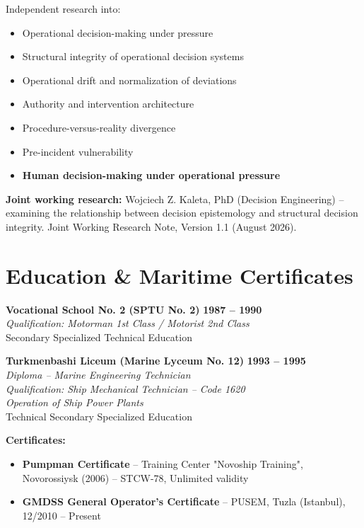 \documentclass[11pt,a4paper]{article}
\begin{document}
Independent research into:
\begin{itemize}[leftmargin=*, nosep, itemsep=2pt]
    \item Operational decision-making under pressure
    \item Structural integrity of operational decision systems
    \item Operational drift and normalization of deviations
    \item Authority and intervention architecture
    \item Procedure-versus-reality divergence
    \item Pre-incident vulnerability
    \item \textbf{Human decision-making under operational pressure}
\end{itemize}

\vspace{4pt}
\textbf{Joint working research:} Wojciech Z. Kaleta, PhD (Decision Engineering) -- examining the relationship between decision epistemology and structural decision integrity. Joint Working Research Note, Version 1.1 (August 2026).

\section*{Education \& Maritime Certificates}

\textbf{\color{avcsdark}Vocational School No. 2 (SPTU No. 2)} \hfill \textbf{\color{avcsgray}1987 -- 1990} \\
\textit{Qualification: Motorman 1st Class / Motorist 2nd Class} \\
Secondary Specialized Technical Education

\vspace{4pt}
\textbf{\color{avcsdark}Turkmenbashi Liceum (Marine Lyceum No. 12)} \hfill \textbf{\color{avcsgray}1993 -- 1995} \\
\textit{Diploma -- Marine Engineering Technician} \\
\textit{Qualification: Ship Mechanical Technician -- Code 1620} \\
\textit{Operation of Ship Power Plants} \\
Technical Secondary Specialized Education

\vspace{4pt}
\textbf{Certificates:}
\begin{itemize}[leftmargin=*, nosep, itemsep=2pt]
    \item \textbf{Pumpman Certificate} -- Training Center "Novoship Training", Novorossiysk (2006) -- STCW-78, Unlimited validity
    \item \textbf{GMDSS General Operator's Certificate} -- PUSEM, Tuzla (Istanbul), 12/2010 -- Present
\end{itemize}
\end{document}
